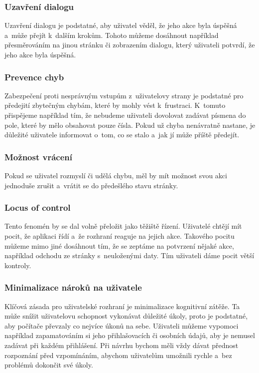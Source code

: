 \subsubsection*{Uzavření dialogu}
Uzavření dialogu je podstatné, aby uživatel věděl, že jeho akce byla úspěšná a~může přejít k~dalším krokům. Tohoto můžeme dosáhnout například přesměrováním na jinou stránku či zobrazením dialogu, který uživateli potvrdí, že jeho akce byla úspěšná.

\pagebreak
\subsubsection*{Prevence chyb}
Zabezpečení proti nesprávným vstupům z~uživatelovy strany je podstatné pro předejití zbytečným chybám, které by mohly vést k~frustraci. K~tomuto přispějeme například tím, že nebudeme uživateli dovolovat zadávat písmena do pole, které by mělo obsahovat pouze čísla. Pokud už chyba nenávratně nastane, je důležité uživatele informovat o~tom, co se stalo a~jak jí může příště předejít.

\subsubsection*{Možnost vrácení}
Pokud se uživatel rozmyslí či udělá chybu, měl by mít možnost svou akci jednoduše zrušit a~vrátit se do předešlého stavu stránky.

\subsubsection*{Locus of control}
Tento fenomén by se dal volně přeložit jako těžiště řízení. Uživatelé chtějí mít pocit, že aplikaci řídí a~že rozhraní reaguje na jejich akce. Takového pocitu můžeme mimo jiné dosáhnout tím, že se zeptáme na potvrzení nějaké akce, například odchodu ze stránky s~neuloženými daty. Tím uživateli dáme pocit větší kontroly.

\subsubsection*{Minimalizace nároků na uživatele}
Klíčová zásada pro uživatelské rozhraní je minimalizace kognitivní zátěže. Ta může snížit uživatelovu schopnost vykonávat důležité úkoly, proto je podstatné, aby počítače převzaly co nejvíce úkonů na sebe. Uživateli můžeme vypomoci například zapamatováním si jeho přihlašovacích či osobních údajů, aby je nemusel zadávat při každém přihlášení. Při návrhu bychom měli vždy dávat přednost rozpoznání před vzpomínáním, abychom uživatelům umožnili rychle a~bez problémů dokončit své úkoly.

